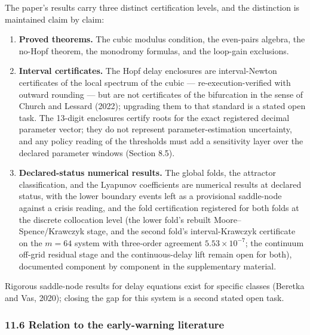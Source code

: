 \documentclass[11pt]{article}
\providecommand{\tightlist}{\setlength{\itemsep}{0pt}\setlength{\parskip}{0pt}}
\begin{document}
The paper's results carry three distinct certification levels, and the
distinction is maintained claim by claim:

\begin{enumerate}
\def\labelenumi{\arabic{enumi}.}
\tightlist
\item
  \textbf{Proved theorems.} The cubic modulus condition, the even-pairs
  algebra, the no-Hopf theorem, the monodromy formulas, and the
  loop-gain exclusions.
\item
  \textbf{Interval certificates.} The Hopf delay enclosures are
  interval-Newton certificates of the local spectrum of the cubic ---
  re-execution-verified with outward rounding --- but are not
  certificates of the bifurcation in the sense of Church and Lessard
  (2022); upgrading them to that standard is a stated open task. The
  13-digit enclosures certify roots for the exact registered decimal
  parameter vector; they do not represent parameter-estimation
  uncertainty, and any policy reading of the thresholds must add a
  sensitivity layer over the declared parameter windows (Section 8.5).
\item
  \textbf{Declared-status numerical results.} The global folds, the
  attractor classification, and the Lyapunov coefficients are numerical
  results at declared status, with the lower boundary events left as a
  provisional saddle-node against a crisis reading, and the fold
  certification registered for both folds at the discrete collocation
  level (the lower fold's rebuilt Moore--Spence/Krawczyk stage, and the
  second fold's interval-Krawczyk certificate on the \(m = 64\) system
  with three-order agreement \(5.53\times10^{-7}\); the continuum
  off-grid residual stage and the continuous-delay lift remain open for
  both), documented component by component in the supplementary
  material.
\end{enumerate}

Rigorous saddle-node results for delay equations exist for specific
classes (Beretka and Vas, 2020); closing the gap for this system is a
second stated open task.

\subsubsection{11.6 Relation to the early-warning
literature}\label{relation-to-the-early-warning-literature}
\end{document}
